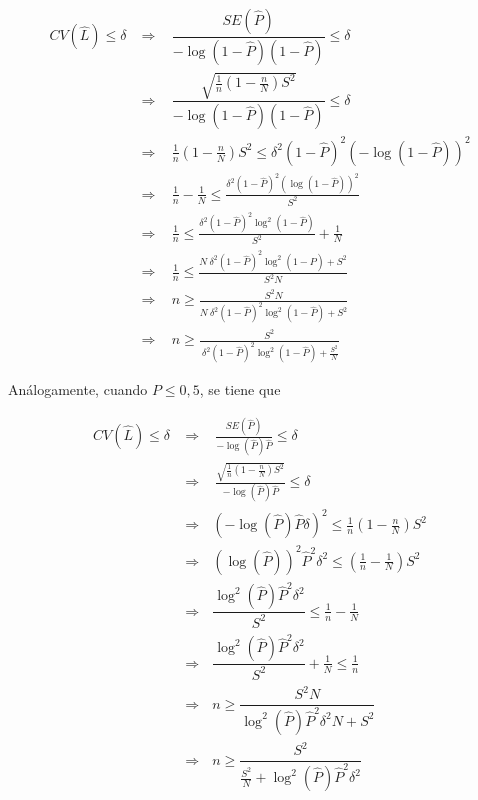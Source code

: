 \documentclass[
  12pt,
  spanish,
]{book}
\begin{document}
\begin{align*}
CV(\hat{L}) \leq \delta 
&\Longrightarrow \ \ \ \ \dfrac{SE(\hat{P})}{-\log(1-\hat{P})(1-\hat{P})} \leq \delta \\
&\Longrightarrow \ \ \ \ \dfrac{\sqrt{\frac{1}{n}(1-\frac{n}{N})S^2}}{-\log (1-\hat{P})(1-\hat{P})} \leq \delta \\
&\Longrightarrow \ \ \ \ 
\frac{1}{n}(1-\frac{n}{N})S^2 \leq \delta^2 (1-\hat{P})^2(-\log (1-\hat{P}))^2 \\ 
&\Longrightarrow \ \ \ \ 
\frac{1}{n}-\frac{1}{N} \leq \frac{\delta^2 (1-\hat{P})^2(\log (1-\hat{P}))^2}{S^2} \\
&\Longrightarrow \ \ \ \ 
\frac{1}{n} \leq \frac{\delta^2 (1-\hat{P})^2\log^2(1-\hat{P})}{S^2} + \frac{1}{N} \\ 
&\Longrightarrow \ \ \ \ 
\frac{1}{n} \leq \frac{N\ \delta^2(1-\hat{P})^2\log^2(1-\hat{P}) +S^2}{S^2N} \\
&\Longrightarrow \ \ \ \ 
n \geq \frac{S^2N}{N\ \delta^2(1-\hat{P})^2\log^2(1-\hat{P}) +S^2} \\
&\Longrightarrow \ \ \ \ 
n \geq \frac{S^2}{\ \delta^2(1-\hat{P})^2\log^2(1-\hat{P}) +\frac{S^2}{N}}
\end{align*}

Análogamente, cuando \(P \leq 0,5\), se tiene que

\begin{align*}
CV(\hat{L}) \leq \delta
&\Longrightarrow \ \ \ \ 
\frac{SE(\hat{P})}{-\log(\hat{P})\hat{P}} \leq \delta \\
&\Longrightarrow \ \ \ \ 
\frac{\sqrt{\frac{1}{n}(1-\frac{n}{N})S^2}}{-\log(\hat{P})\hat{P}}\leq \delta \\
&\Longrightarrow \ \ \ 
(-\log (\hat{P})\hat{P}\delta)^2 \leq \frac{1}{n}(1-\frac{n}{N})S^2 \\
&\Longrightarrow \ \ \ 
(\log (\hat{P}))^2\hat{P}^2\delta^2 \leq (\frac{1}{n}-\frac{1}{N})S^2 \\
&\Longrightarrow \ \ \ 
\dfrac{\log^2(\hat{P})\hat{P}^2\delta^2}{S^2} \leq \frac{1}{n} - \frac{1}{N} \\
&\Longrightarrow \ \ \ 
\dfrac{\log^2(\hat{P})\hat{P}^2\delta^2}{S^2} + \frac{1}{N} \leq \frac{1}{n} \\ 
&\Longrightarrow \ \ \ 
n \geq \dfrac{S^2N}{\log^2(\hat{P})\hat{P}^2\delta^2N + S^2}\\
&\Longrightarrow \ \ \ 
n \geq \dfrac{S^2}{\frac{S^2}{N}+\log^2(\hat{P})\hat{P}^2\delta^2}
\end{align*}
\end{document}
